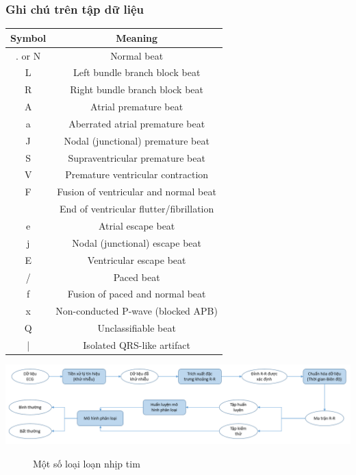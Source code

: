 \subsubsection{Ghi chú trên tập dữ liệu}
\begin{center}
    \begin{tabular}{|c|c|}
         \hline
         Symbol & Meaning \\
         \hline
         . or N & Normal beat \\
         \hline
         L & Left bundle branch block beat \\
         \hline
         R & Right bundle branch block beat \\
         \hline
         A & Atrial premature beat \\
         \hline
         a & Aberrated atrial premature beat \\
         \hline
         J & Nodal (junctional) premature beat\\
         S & Supraventricular premature beat\\
         \hline
         V & Premature ventricular contraction\\
         \hline
         F & Fusion of ventricular and normal beat\\
         \hline
         [ & Start of ventricular flutter/fibrillation\\
         \hline
         ! & Ventricular flutter wave\\
         \hline
         ] & End of ventricular flutter/fibrillation\\
         \hline
         e & Atrial escape beat\\
         \hline
         j & Nodal (junctional) escape beat\\
         \hline
         E & Ventricular escape beat\\
         \hline
         / & Paced beat\\
         \hline
         f & Fusion of paced and normal beat\\
         \hline
         x & Non-conducted P-wave (blocked APB)\\
         \hline
         Q & Unclassifiable beat\\
         \hline
         | & Isolated QRS-like artifact\\
         \hline
    \end{tabular}
\end{center}
\begin{center}
    \includegraphics[scale=.5]{image/chapter5/system.png}
    \begin{figure}[htp]
    \begin{center}
    \end{center}
    \caption{Một số loại loạn nhịp tim}
    \end{figure}
\end{center}


